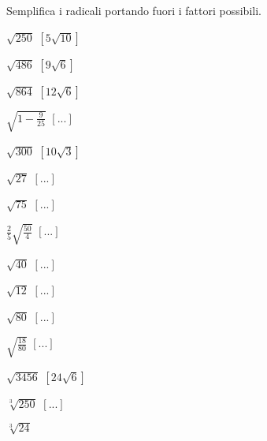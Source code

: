 \begin{esercizio}[\Ast]
 \label{ese:2.42}
Semplifica i radicali portando fuori i fattori possibili.
 \begin{multicols}{4}
 \begin{enumeratea}
 \item $\sqrt{250}$
  \hfill $\left[5\sqrt{10}\right]$
 \item $\sqrt{486}$
  \hfill $\left[9\sqrt 6\right]$
 \item $\sqrt{864}$
  \hfill $\left[12\sqrt 6\right]$
 \item $\sqrt{1-\frac 9{25}}$
  \hfill $\left[...\right]$
 \item $\sqrt{300}$
  \hfill $\left[10\sqrt 3\right]$
 \item $\sqrt{27}$
  \hfill $\left[...\right]$
 \item $\sqrt{75}$
  \hfill $\left[...\right]$
 \item $\frac 2 5\sqrt{\frac{50} 4}$
  \hfill $\left[...\right]$
 \item $\sqrt{40}$
  \hfill $\left[...\right]$
 \item $\sqrt{12}$
  \hfill $\left[...\right]$
 \item $\sqrt{80}$
  \hfill $\left[...\right]$
 \item $\sqrt{\frac{18}{80}}$
  \hfill $\left[...\right]$
 \item $\sqrt{3456}$
  \hfill $\left[24\sqrt 6\right]$
 \item $\sqrt[3]{250}$
  \hfill $\left[...\right]$
 \item $\sqrt[3]{24}$

\end{enumeratea}
\end{multicols}
\end{esercizio}
